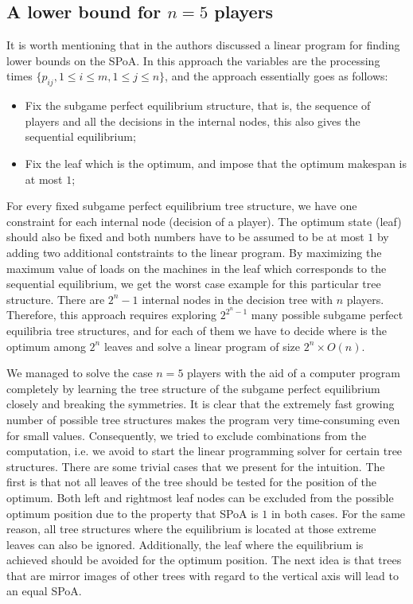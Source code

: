 \documentclass[12pt,a4paper]{article}
\theoremstyle{definition}
\theoremstyle{remark}
\newcommand{\SPoA}{SPoA}
\begin{document}
\subsection{A lower bound for $n=5$ players}
It is worth mentioning that in \cite{Hassin} the authors discussed a linear program for finding lower bounds on the \SPoA. In this approach the variables are the processing times $\{p_{ij}, 1\leq i \leq m, 1\leq j \leq n \}$, and the approach essentially goes  as follows: 
\begin{itemize}
	\item Fix the subgame perfect equilibrium structure, that is, the sequence of players and all the decisions in the internal nodes, this also gives the sequential equilibrium;
	\item Fix the leaf which is the optimum, and impose that the optimum makespan is at most $1$; 
\end{itemize}
For every fixed  subgame perfect equilibrium tree structure, we have one constraint for each internal node (decision of a player).
  The optimum state (leaf) should also be fixed and both numbers have to be assumed to be at most $1$ by adding two additional contstraints to the linear program. By maximizing the maximum value of loads on the machines in the leaf which corresponds to the sequential equilibrium, we get the worst case example for this particular tree structure. There are $2^{n}-1$ internal nodes in the decision tree with $n$ players. Therefore, this  approach requires exploring $2^{2^{n}-1}$ many possible subgame perfect equilibria tree structures, and for each of them we have to decide where is the optimum among $2^n$ leaves and solve a linear program of size $2^n \times O(n)$.

We managed to solve the case $n=5$ players with the aid of a computer program completely by learning the tree structure of the subgame perfect equilibrium closely and breaking the symmetries. 
It is clear that the extremely fast growing number of possible tree structures
makes the program very time-consuming even for small values. Consequently, we tried to exclude combinations from the
computation, i.e. we avoid to start the linear programming solver for
certain tree structures. There are some trivial cases that we present for the intuition. The first is that not
all leaves of the tree should be tested for the position of the optimum. Both
left and rightmost leaf nodes can be excluded from the possible optimum position due to
the property that SPoA is $1$ in both cases. For the same reason, all tree structures
where the equilibrium is located at those extreme leaves can also be ignored.
Additionally, the leaf where the equilibrium is achieved should be avoided for
the optimum position.
The next idea is that trees that are mirror images of other trees with regard
to the vertical axis will lead to an equal SPoA. 
\end{document}
